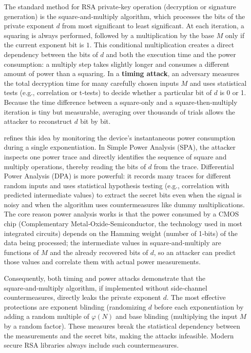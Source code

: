 The standard method for RSA private‑key operation (decryption or signature generation) is the square‑and‑multiply algorithm, which processes the bits of the private exponent \(d\) from most significant to least significant. At each iteration, a squaring is always performed, followed by a multiplication by the base \(M\) only if the current exponent bit is \(1\). This conditional multiplication creates a direct dependency between the bits of \(d\) and both the execution time and the power consumption: a multiply step takes slightly longer and consumes a different amount of power than a squaring. In a \textbf{timing attack}, an adversary measures the total decryption time for many carefully chosen inputs \(M\) and uses statistical tests (e.g., correlation or t‑tests) to decide whether a particular bit of \(d\) is 0 or 1. Because the time difference between a square‑only and a square‑then‑multiply iteration is tiny but measurable, averaging over thousands of trials allows the attacker to reconstruct \(d\) bit by bit.

refines this idea by monitoring the device’s instantaneous power consumption during a single exponentiation. In Simple Power Analysis (SPA), the attacker inspects one power trace and directly identifies the sequence of square and multiply operations, thereby reading the bits of \(d\) from the trace. Differential Power Analysis (DPA) is more powerful: it records many traces for different random inputs and uses statistical hypothesis testing (e.g., correlation with predicted intermediate values) to extract the secret bits even when the signal is noisy and when the algorithm uses countermeasures like dummy multiplications. The core reason power analysis works is that the power consumed by a CMOS chip (Complementary Metal‑Oxide‑Semiconductor, the technology used in most integrated circuits) depends on the Hamming weight (number of 1‑bits) of the data being processed; the intermediate values in square‑and‑multiply are functions of \(M\) and the already recovered bits of \(d\), so an attacker can predict those values and correlate them with actual power measurements.

Consequently, both timing and power attacks demonstrate that the square‑and‑multiply algorithm, if implemented without side‑channel countermeasures, directly leaks the private exponent \(d\). The most effective protections are exponent blinding (randomizing \(d\) before each exponentiation by adding a random multiple of \(\varphi(N)\) and base blinding (multiplying the input \(M\) by a random factor). These measures break the statistical dependency between the measurements and the secret bits, making the attacks infeasible. Modern secure RSA libraries always include such countermeasures.



